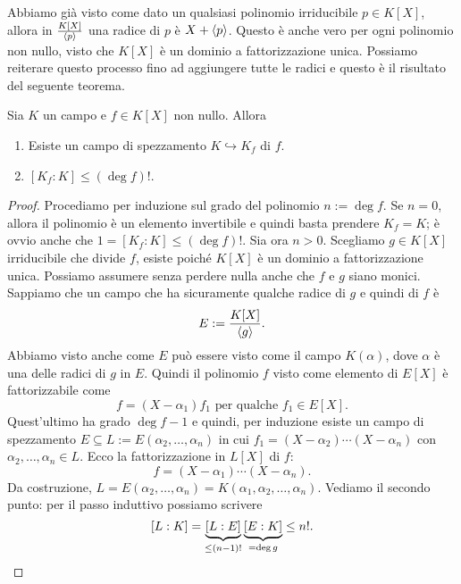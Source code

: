 
Abbiamo già visto come dato un qualsiasi polinomio irriducibile $p \in K[X]$, allora in $\frac{K[X]}{\left\langle p\right\rangle}$ una radice di $p$ è $X + \left\langle p\right\rangle$. Questo è anche vero per ogni polinomio non nullo, visto che $K[X]$ è un dominio a fattorizzazione unica. Possiamo reiterare questo processo fino ad aggiungere tutte le radici e questo è il risultato del seguente teorema.

\begin{teor}\label{teor:EsistenzaCampoSpezzamento}
Sia $K$ un campo e $f \in K[X]$ non nullo. Allora
\begin{enumerate}
\item Esiste un campo di spezzamento $K \hookrightarrow K_f$ di $f$.
\item $\left[K_f:K\right] \le (\deg f)!$.%
\end{enumerate}
\end{teor}

\begin{proof}
Procediamo per induzione sul grado del polinomio $n := \deg f$. Se $n=0$, allora il polinomio è un elemento invertibile e quindi basta prendere $K_f = K$; è ovvio anche che $1 = \left[K_f:K\right] \le (\deg f)!$. Sia ora $n>0$. Scegliamo $g \in K[X]$ irriducibile che divide $f$, esiste poiché $K[X]$ è un dominio a fattorizzazione unica. Possiamo assumere senza perdere nulla anche che $f$ e $g$ siano monici. Sappiamo che un campo che ha sicuramente qualche radice di $g$ e quindi di $f$ è
\[E := \frac{K[X]}{\left\langle g\right\rangle} .\]
Abbiamo visto anche come $E$ può essere visto come il campo $K(\alpha)$, dove $\alpha$ è una delle radici di $g$ in $E$. Quindi il polinomio $f$ visto come elemento di $E[X]$ è fattorizzabile come
\[f = (X-\alpha_1) f_1 \text{ per qualche } f_1 \in E[X] .\]
Quest'ultimo ha grado $\deg f -1$ e quindi, per induzione esiste un campo di spezzamento $E \subseteq L := E\left(\alpha_2, \dots{}, \alpha_n\right)$ in cui $f_1 = (X-\alpha_2) \cdots{} (X-\alpha_n)$ con $\alpha_2, \dots{}, \alpha_n \in L$. Ecco la fattorizzazione in $L[X]$ di $f$:
\[f = (X-\alpha_1)\cdots{}(X-\alpha_n) .\]
Da costruzione, $L = E\left(\alpha_2, \dots{}, \alpha_n\right) = K\left(\alpha_1, \alpha_2, \dots{}, \alpha_n\right)$. Vediamo il secondo punto: per il passo induttivo possiamo scrivere
\[[L : K] = \underbrace{[L : E]}_{\le (n-1)!} \underbrace{[E : K]}_{= \deg g} \le n! . \qedhere\]
\end{proof}

